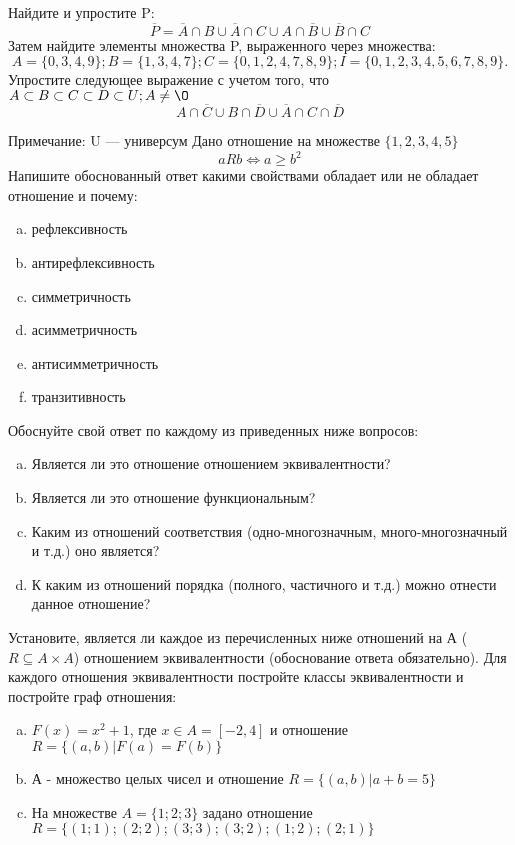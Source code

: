 \documentclass[10pt]{exam}
\begin{document}
\begin{questions}
\question
Найдите и упростите P:
\begin{equation*}
\overline{P} = \overline{A} \cap B \cup \overline{A} \cap C \cup A \cap \overline{B} \cup \overline{B} \cap C
\end{equation*}
Затем найдите элементы множества P, выраженного через множества:
\begin{equation*}
A = \{0, 3, 4, 9\}; 
B = \{1, 3, 4, 7\};
C = \{0, 1, 2, 4, 7, 8, 9\};
I = \{0, 1, 2, 3, 4, 5, 6, 7, 8, 9\}.
\end{equation*}\question
Упростите следующее выражение с учетом того, что $A\subset B \subset C \subset D \subset U; A \neq \O$
\begin{equation*}
A \cap  \overline{C} \cup B \cap \overline{D} \cup  \overline{A} \cap C \cap  \overline{D}
\end{equation*}

Примечание: U — универсум\question
Дано отношение на множестве $\{1, 2, 3, 4, 5\}$ 
\begin{equation*}
aRb \iff a \geq b^2
\end{equation*}
Напишите обоснованный ответ какими свойствами обладает или не обладает отношение и почему:   
\begin{enumerate} [a)]\setcounter{enumi}{0}
\item рефлексивность
\item антирефлексивность
\item симметричность
\item асимметричность
\item антисимметричность
\item транзитивность
\end{enumerate}

Обоснуйте свой ответ по каждому из приведенных ниже вопросов:
\begin{enumerate} [a)]\setcounter{enumi}{0}
    \item Является ли это отношение отношением эквивалентности?
    \item Является ли это отношение функциональным?
    \item Каким из отношений соответствия (одно-многозначным, много-многозначный и т.д.) оно является?
    \item К каким из отношений порядка (полного, частичного и т.д.) можно отнести данное отношение?
\end{enumerate}


\question
Установите, является ли каждое из перечисленных ниже отношений на А ($R \subseteq A \times A$) отношением эквивалентности (обоснование ответа обязательно). Для каждого отношения эквивалентности постройте классы эквивалентности и постройте граф отношения:
\begin{enumerate} [a)]\setcounter{enumi}{0}
\item $F(x)=x^{2}+1$, где $x \in A = [-2, 4]$ и отношение $R = \{(a,b)|F(a) = F(b)\}$
\item А - множество целых чисел и отношение $R = \{(a,b)|a + b = 5\}$
\item На множестве $A = \{1; 2; 3\}$ задано отношение $R = \{(1; 1); (2; 2); (3; 3); (3; 2); (1; 2); (2; 1)\}$


\end{enumerate}
\end{questions}
\end{document}
